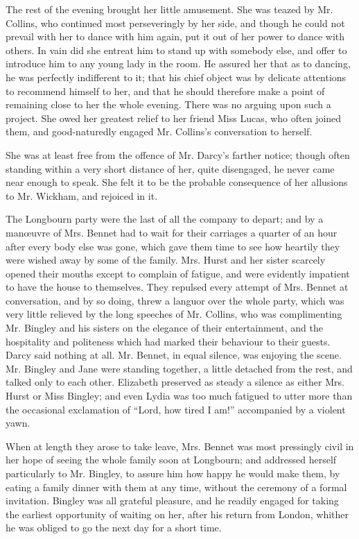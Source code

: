 The rest of the evening brought her little amusement.
She was teazed by Mr. Collins, who continued most perseveringly
by her side, and though he could not prevail
with her to dance with him again, put it out of her power
to dance with others. In vain did she entreat him to stand
up with somebody else, and offer to introduce him to any
young lady in the room. He assured her that as to dancing,
he was perfectly indifferent to it; that his chief object
was by delicate attentions to recommend himself to her,
and that he should therefore make a point of remaining
close to her the whole evening. There was no arguing
upon such a project. She owed her greatest relief to her
friend Miss Lucas, who often joined them, and good-naturedly
engaged Mr. Collins’s conversation to herself.

She was at least free from the offence of Mr. Darcy’s
farther notice; though often standing within a very short
distance of her, quite disengaged, he never came near
enough to speak. She felt it to be the probable consequence
of her allusions to Mr. Wickham, and rejoiced in it.

The Longbourn party were the last of all the company
to depart; and by a manœuvre of Mrs. Bennet had to
wait for their carriages a quarter of an hour after every
body else was gone, which gave them time to see how
heartily they were wished away by some of the family.
Mrs. Hurst and her sister scarcely opened their mouths
except to complain of fatigue, and were evidently impatient
to have the house to themselves. They repulsed every
attempt of Mrs. Bennet at conversation, and by so doing,
threw a languor over the whole party, which was very
little relieved by the long speeches of Mr. Collins, who was
complimenting Mr. Bingley and his sisters on the elegance
of their entertainment, and the hospitality and politeness
which had marked their behaviour to their guests. Darcy
said nothing at all. Mr. Bennet, in equal silence, was
enjoying the scene. Mr. Bingley and Jane were standing
together, a little detached from the rest, and talked only
to each other. Elizabeth preserved as steady a silence as
either Mrs. Hurst or Miss Bingley; and even Lydia was
too much fatigued to utter more than the occasional
exclamation of “Lord, how tired I am!” accompanied
by a violent yawn.

When at length they arose to take leave, Mrs. Bennet
was most pressingly civil in her hope of seeing the whole
family soon at Longbourn; and addressed herself particularly
to Mr. Bingley, to assure him how happy he would
make them, by eating a family dinner with them at any
time, without the ceremony of a formal invitation. Bingley
was all grateful pleasure, and he readily engaged for taking
the earliest opportunity of waiting on her, after his return
from London, whither he was obliged to go the next day
for a short time.


